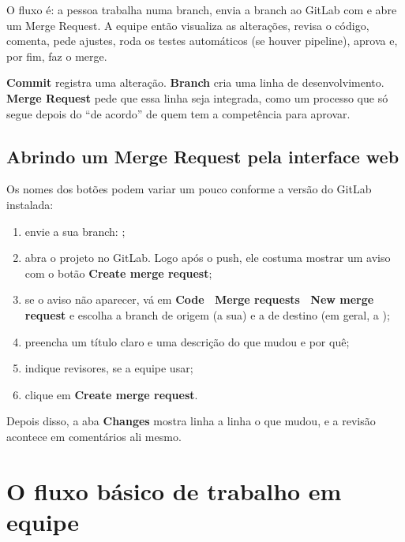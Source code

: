O fluxo é: a pessoa trabalha numa branch, envia a branch ao GitLab com  e abre um Merge Request. A equipe então visualiza as alterações, revisa o código, comenta, pede ajustes, roda os testes automáticos (se houver pipeline), aprova e, por fim, faz o merge.

\begin{analogia}
\textbf{Commit} registra uma alteração. \textbf{Branch} cria uma linha de desenvolvimento. \textbf{Merge Request} pede que essa linha seja integrada, como um processo que só segue depois do \enquote{de acordo} de quem tem a competência para aprovar.
\end{analogia}

\subsection{Abrindo um Merge Request pela interface web}

Os nomes dos botões podem variar um pouco conforme a versão do GitLab instalada:

\begin{enumerate}
  \item envie a sua branch: ;
  \item abra o projeto no GitLab. Logo após o push, ele costuma mostrar um aviso com o botão \textbf{Create merge request};
  \item se o aviso não aparecer, vá em \textbf{Code \faChevronRight\ Merge requests \faChevronRight\ New merge request} e escolha a branch de origem (a sua) e a de destino (em geral, a );
  \item preencha um título claro e uma descrição do que mudou e por quê;
  \item indique revisores, se a equipe usar;
  \item clique em \textbf{Create merge request}.
\end{enumerate}

Depois disso, a aba \textbf{Changes} mostra linha a linha o que mudou, e a revisão acontece em comentários ali mesmo.

\section{O fluxo básico de trabalho em equipe}

